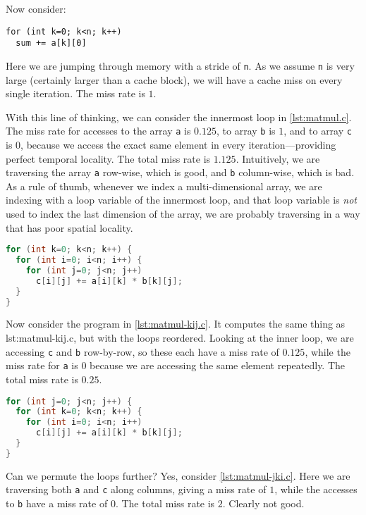 Now consider:
\begin{lstlisting}
for (int k=0; k<n; k++)
  sum += a[k][0]
\end{lstlisting}
Here we are jumping through memory with a stride of \texttt{n}.  As we
assume \texttt{n} is very large (certainly larger than a cache block),
we will have a cache miss on every single iteration.  The miss rate is
$1$.

With this line of thinking, we can consider the innermost loop in
\cref{lst:matmul.c}.  The miss rate for accesses to the array
\texttt{a} is $0.125$, to array \texttt{b} is $1$, and to array
\texttt{c} is $0$, because we access the exact same element in every
iteration---providing perfect temporal locality.  The total miss rate
is $1.125$.  Intuitively, we are traversing the array \texttt{a}
row-wise, which is good, and \texttt{b} column-wise, which is bad.  As
a rule of thumb, whenever we index a multi-dimensional array, we are
indexing with a loop variable of the innermost loop, and that loop
variable is \emph{not} used to index the last dimension of the array,
we are probably traversing in a way that has poor spatial locality.

\begin{lstlisting}[caption=Matrix multiplication in C with the loops permuted.,
label={lst:matmul-kij.c},
language=C,
frame=single]
for (int k=0; k<n; k++) {
  for (int i=0; i<n; i++) {
    for (int j=0; j<n; j++)
      c[i][j] += a[i][k] * b[k][j];
  }
}
\end{lstlisting}

Now consider the program in \cref{lst:matmul-kij.c}.  It computes the
same thing as {lst:matmul-kij.c}, but with the loops reordered.
Looking at the inner loop, we are accessing \texttt{c} and \texttt{b}
row-by-row, so these each have a miss rate of $0.125$, while the miss
rate for \texttt{a} is $0$ because we are accessing the same element
repeatedly.  The total miss rate is $0.25$.

\begin{lstlisting}[caption=Matrix multiplication in C with the loops permuted.,
label={lst:matmul-jki.c},
language=C,
frame=single]
for (int j=0; j<n; j++) {
  for (int k=0; k<n; k++) {
    for (int i=0; i<n; i++)
      c[i][j] += a[i][k] * b[k][j];
  }
}
\end{lstlisting}

Can we permute the loops further?  Yes, consider
\cref{lst:matmul-jki.c}.  Here we are traversing both \texttt{a} and
\texttt{c} along columns, giving a miss rate of $1$, while the
accesses to \texttt{b} have a miss rate of $0$.  The total miss rate
is $2$.  Clearly not good.

